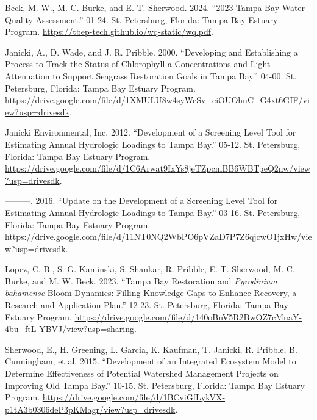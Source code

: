 \documentclass[
  letterpaper,
  DIV=11,
  numbers=noendperiod]{scrreport}
\newlength{\cslhangindent}
\newenvironment{CSLReferences}[2] %
 {\begin{list}{}{%
  \setlength{\itemindent}{0pt}
  \setlength{\leftmargin}{0pt}
  \setlength{\parsep}{0pt}
  \ifodd #1
   \setlength{\leftmargin}{\cslhangindent}
   \setlength{\itemindent}{-1\cslhangindent}
  \fi
  \setlength{\itemsep}{#2\baselineskip}}}
 {\end{list}}
\begin{document}
\label{refs}
\begin{CSLReferences}{1}{0}
Beck, M. W., M. C. Burke, and E. T. Sherwood. 2024. {``{2023 Tampa Bay
Water Quality Assessment}.''} 01-24. St. Petersburg, Florida: Tampa Bay
Estuary Program. \url{https://tbep-tech.github.io/wq-static/wq.pdf}.

Janicki, A., D. Wade, and J. R. Pribble. 2000. {``{Developing and
Establishing a Process to Track the Status of Chlorophyll-a
Concentrations and Light Attenuation to Support Seagrass Restoration
Goals in Tampa Bay}.''} 04-00. St. Petersburg, Florida: Tampa Bay
Estuary Program.
\url{https://drive.google.com/file/d/1XMULU8w4syWcSv_ciOUOhnC_G4xt6GIF/view?usp=drivesdk}.

Janicki Environmental, Inc. 2012. {``Development of a Screening Level
Tool for Estimating Annual Hydrologic Loadings to {T}ampa {B}ay.''}
05-12. St. Petersburg, Florida: Tampa Bay Estuary Program.
\url{https://drive.google.com/file/d/1C6Arwat9IxYs8jeTZpcmBB6WBTpeQ2nw/view?usp=drivesdk}.

---------. 2016. {``Update on the Development of a Screening Level Tool
for Estimating Annual Hydrologic Loadings to {T}ampa {B}ay.''} 03-16.
St. Petersburg, Florida: Tampa Bay Estuary Program.
\url{https://drive.google.com/file/d/11NT0NQ2WbPO6pVZaD7P7Z6qjcwO1jxHw/view?usp=drivesdk}.

Lopez, C. B., S. G. Kaminski, S. Shankar, R. Pribble, E. T. Sherwood, M.
C. Burke, and M. W. Beck. 2023. {``{T}ampa {B}ay Restoration and
\emph{{P}yrodinium {b}ahamense} Bloom Dynamics: Filling Knowledge Gaps
to Enhance Recovery, a Research and Application Plan.''} 12-23. St.
Petersburg, Florida: Tampa Bay Estuary Program.
\url{https://drive.google.com/file/d/140oBnV5R2BwOZ7cMuaY-4bu_ftL-YBVJ/view?usp=sharing}.

Sherwood, E., H. Greening, L. Garcia, K. Kaufman, T. Janicki, R.
Pribble, B. Cunningham, et al. 2015. {``Development of an {I}ntegrated
{E}cosystem {M}odel to Determine Effectiveness of Potential Watershed
Management Projects on Improving {O}ld {T}ampa {B}ay.''} 10-15. St.
Petersburg, Florida: Tampa Bay Estuary Program.
\url{https://drive.google.com/file/d/1BCviGfLykVX-p1tA3b0306deP3pKMagr/view?usp=drivesdk}.

\end{CSLReferences}
\end{document}
